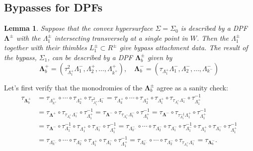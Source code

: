 \documentclass[11pt]{amsart}
\newcommand{\thicc}[1]{\pmb{#1}}
\newcommand{\posNegRegion}{R^{\pm}}
\newcommand{\Lag}{L}
\newcommand{\posNegLag}{\Lag^{\pm}}
\newcommand{\Leg}{\Lambda}
\newcommand{\posLeg}{\Leg^{+}}
\newcommand{\negLeg}{\Leg^{-}}
\newcommand{\thiccPosLeg}{\thicc{\Leg}^{+}}
\newcommand{\thiccNegLeg}{\thicc{\Leg}^{-}}
\newcommand{\thiccPosNegLeg}{\thicc{\Leg}^{\pm}}
\newcommand{\posNegLeg}{\Leg^{\pm}}
\newtheorem{lemma}[thm]{Lemma}
\begin{document}
\subsection{Bypasses for DPFs}

\begin{lemma}\label{Lemma:OBBypass}
Suppose that the convex hypersurface $\Sigma = \Sigma_{0}$ is described by a DPF $\thiccPosNegLeg$ with the $\posNegLeg_{1}$ intersecting transversely at a single point in $W$. Then the $\posNegLeg_{1}$ together with their thimbles $\posNegLag_{1} \subset \posNegRegion$ give bypass attachment data. The result of the bypass, $\Sigma_{1}$, can be described by a DPF $\thiccPosNegLeg_{b}$ given by
\begin{equation*}
\thiccPosLeg_{b} = (\tau_{\posLeg_{1}}^{2}\negLeg_{1}, \posLeg_{2}, \dots, \posLeg_{k^{+}}), \quad \thiccNegLeg_{b} = (\tau_{\posLeg_{1}}\negLeg_{1}, \negLeg_{2}, \dots, \negLeg_{k^{-}})
\end{equation*}
\end{lemma}

Let's first verify that the monodromies of the $\thiccPosNegLeg_{b}$ agree as a sanity check:
\begin{equation*}
\begin{aligned}
\tau_{\thiccPosLeg_{b}} &= \tau_{\posLeg_{k^{+}}} \circ \cdots \circ \tau_{\posLeg_{2}} \circ \tau_{\tau_{\posLeg_{1}}^{2}\negLeg_{1}} = \tau_{\posLeg_{k}} \circ \cdots \circ \tau_{\posLeg_{2}} \circ \tau_{\posLeg_{1}} \circ \tau_{\tau_{\posLeg_{1}}\negLeg_{1}} \circ \tau_{\posLeg_{1}}^{-1} \\
&=  \tau_{\thiccPosLeg} \circ \tau_{\tau_{\posLeg_{1}}\negLeg_{1}} \circ \tau_{\posLeg_{1}}^{-1} = \tau_{\thiccNegLeg} \circ \tau_{\tau_{\posLeg_{1}}\negLeg_{1}} \circ \tau_{\posLeg_{1}}^{-1}  = \tau_{\thiccNegLeg} \circ \tau_{\tau_{\negLeg_{1}}^{-1}\posLeg_{1}} \circ \tau_{\posLeg_{1}}^{-1}\\
&= \tau_{\thiccNegLeg} \circ \tau_{\negLeg_{1}}^{-1}\circ \tau_{\posLeg_{1}}\circ \tau_{\negLeg_{1}} \circ \tau_{\posLeg_{1}}^{-1} = \tau_{\negLeg_{k^{-}}}\circ \cdots \circ \tau_{\negLeg_{2}} \circ \tau_{\negLeg_{1}} \circ \tau_{\negLeg_{1}}^{-1}\circ \tau_{\posLeg_{1}}\circ \tau_{\negLeg_{1}} \circ \tau_{\posLeg_{1}}^{-1}\\
&= \tau_{\negLeg_{k^{-}}}\circ \cdots \circ \tau_{\negLeg_{2}} \circ \tau_{\posLeg_{1}}\circ \tau_{\negLeg_{1}} \circ \tau_{\posLeg_{1}}^{-1} = \tau_{\negLeg_{k^{-}}}\circ \cdots \circ \tau_{\negLeg_{2}} \circ \tau_{\tau_{\posLeg_{1}}\negLeg_{1}} = \tau_{\thiccNegLeg_{b}}.
\end{aligned}
\end{equation*}
\end{document}
